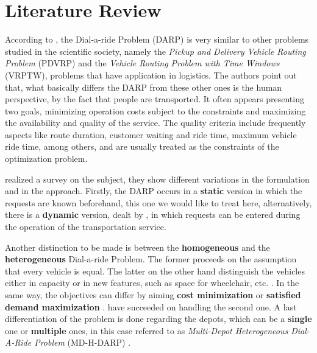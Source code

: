 \documentclass[tuberlin,cic,tc,openright,english,noabntcite,oneside]{iiufrgs}
\begin{document}
\chapter{Literature Review}
According to \textcite[p. 30]{cordeau_dial--ride_2007}, the Dial-a-ride Problem (DARP) is very similar to other problems studied in the scientific society, namely the \emph{Pickup and Delivery Vehicle Routing Problem} (PDVRP) and the \emph{Vehicle Routing Problem with Time Windows} (VRPTW), problems that have application in logistics. The authors point out that, what basically differs the DARP from these other ones is the human perspective, by the fact that people are transported. It often appears presenting two goals, minimizing operation costs subject to the constraints and maximizing the availability and quality of the service. The quality criteria include frequently aspects like route duration, customer waiting and ride time, maximum vehicle ride time, among others, and are usually treated as the constraints of the optimization problem.

\textcite{cordeau_dial--ride_2007} realized a survey on the subject, they show different variations in the formulation and in the approach. Firstly, the DARP occurs in a \textbf{static} version in which the requests are known beforehand, this one we would like to treat here, alternatively, there is a \textbf{dynamic} version, dealt by \textcite{berbeglia_dynamic_2010}, in which requests can be entered during the operation of the transportation service.

Another distinction to be made is between the \textbf{homogeneous} and the \textbf{heterogeneous} Dial-a-ride Problem. The former proceeds on the assumption that every vehicle is equal. The latter on the other hand distinguish the vehicles either in capacity or in new features, such as space for wheelchair, etc. \parencite[p. 593]{parragh_models_2012}. In the same way, the objectives can differ by aiming \textbf{cost minimization} or \textbf{satisfied demand maximization} \parencite[p. 30]{cordeau_dial--ride_2007}. \textcite{urra_hyperheuristic_2015} have succeeded on handling the second one. A last differentiation of the problem is done regarding the depots, which can be a \textbf{single} one or \textbf{multiple} ones, in this case referred to as \emph{Multi-Depot Heterogeneous Dial-A-Ride Problem} (MD-H-DARP) \parencite[p. 166]{braekers_exact_2014}.
\end{document}
